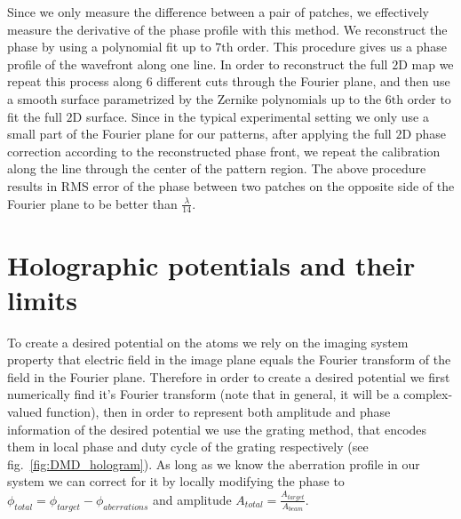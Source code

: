 Since we only measure the difference between a pair of patches, we effectively measure the derivative of the phase profile with this method. We reconstruct the phase by using a polynomial fit up to $7\mathrm{th}$ order. This procedure gives us a phase profile of the wavefront along one line. In order to reconstruct the full $2\mathrm{D}$ map we repeat this process along 6 different cuts through the Fourier plane, and then use a smooth surface parametrized by the Zernike polynomials up to the $6\mathrm{th}$ order to fit the full $2\mathrm{D}$ surface. Since in the typical experimental setting we only use a small part of the Fourier plane for our patterns, after applying the full $2\mathrm{D}$ phase correction according to the reconstructed phase front, we repeat the calibration along the line through the center of the pattern region. The above procedure results in RMS error of the phase between two patches on the opposite side of the Fourier plane to be better than $\frac{\lambda}{14}$.

\section{Holographic potentials and their limits}
To create a desired potential on the atoms we rely on the imaging system property that electric field in the image plane equals the Fourier transform of the field in the Fourier plane. Therefore in order to create a desired potential we first numerically find it's Fourier transform (note that in general, it will be a complex-valued function), then in order to represent both amplitude and phase information of the desired potential we use the grating method, that encodes them in local phase and duty cycle of the grating respectively (see fig.~\ref{fig:DMD_hologram}). As long as we know the aberration profile in our system we can correct for it by locally modifying the phase to $\phi_{total} = \phi_{target} - \phi_{aberrations}$ and amplitude $A_{total} = \frac{A_{target}}{A_{beam}}$.

